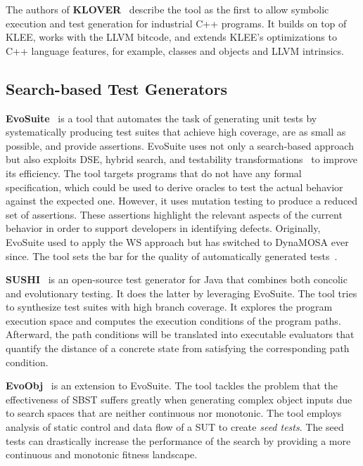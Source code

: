 \documentclass{article}
\begin{document}
The authors of \textbf{KLOVER}~\cite{Li2011} describe the tool as the first to allow symbolic execution and test generation for industrial C++ programs. It builds on top of KLEE, works with the LLVM bitcode, and extends KLEE's optimizations to C++ language features, for example, classes and objects and LLVM intrinsics.


\subsection{Search-based Test Generators}
\textbf{EvoSuite}~\cite{Fraser_2011} is a tool that automates the task of generating unit tests by systematically producing test suites that achieve high coverage, are as small as possible, and provide assertions. EvoSuite uses not only a search-based approach but also exploits \ac{DSE}, hybrid search, and testability transformations~\cite{Harman2004} to improve its efficiency. The tool targets programs that do not have any formal specification, which could be used to derive oracles to test the actual behavior against the expected one. However, it uses mutation testing to produce a reduced set of assertions. These assertions highlight the relevant aspects of the current behavior in order to support developers in identifying defects. Originally, EvoSuite used to apply the \ac{WS} approach but has switched to \ac{DynaMOSA} ever since. The tool sets the bar for the quality of automatically generated tests~\cite{Vogl2021,Panichella2020,Campos2019,Fraser2018,Fraser2016,Fraser2017}.

\textbf{SUSHI}~\cite{Braione2018} is an open-source test generator for Java that combines both concolic and evolutionary testing. It does the latter by leveraging EvoSuite. The tool tries to synthesize test suites with high branch coverage. It explores the program execution space and computes the execution conditions of the program paths. Afterward, the path conditions will be translated into executable evaluators that quantify the distance of a concrete state from satisfying the corresponding path condition.

\textbf{EvoObj}~\cite{Lin2021} is an extension to EvoSuite. The tool tackles the problem that the effectiveness of \ac{SBST} suffers greatly when generating complex object inputs due to search spaces that are neither continuous nor monotonic. The tool employs analysis of static control and data flow of a \ac{SUT} to create \textit{seed tests}. The seed tests can drastically increase the performance of the search by providing a more continuous and monotonic fitness landscape.
\end{document}
